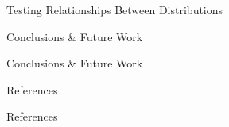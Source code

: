 \documentclass[22pt]{beamer}
\begin{document}
\begin{frame}[fragile]
\begin{textblock}{5}
\begin{block}{Testing Relationships Between Distributions}
\end{block}


\begin{block}{Conclusions \& Future Work}

Conclusions \& Future Work

\end{block}


\begin{block}{References}

References

\end{block}


% 

\end{textblock}
\end{frame}
\end{document}
